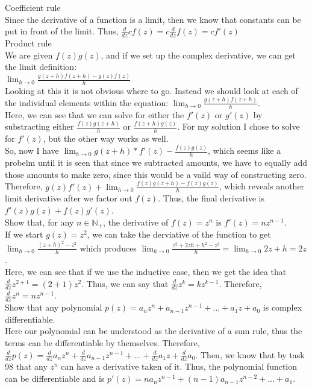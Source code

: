 \documentclass[12pt]{article}
\begin{document}
 Coefficient rule\\
Since the derivative of a function is a limit, then we know that constants can be put in front of the limit.
Thus, $\frac{d}{dz} cf(z) = c \frac{d}{dz} f(z) = cf'(z)$\\

 Product rule\\
We are given $f(z)g(z)$, and if we set up the complex derivative, we can get the limit definition:\\
$\lim_{h\to0} \frac{g(z+h)f(z+h)-g(z)f(z)}{h}$\\
Looking at this it is not obvious where to go. Instead we should look at each of the individual elements within the equation: $\lim_{h\to0} \frac{g(z+h)f(z+h)}{h}$.\\
Here, we can see that we can solve for either the $f'(z)$ or $g'(z)$ by substracting either $\frac{f(z)g(z+h)}{h}$ or $\frac{f(z+h)g(z)}{h}$. 
For my solution I chose to solve for $f'(z)$, but the other way works as well. \\

So, now I have $\lim_{h\to0}g(z+h)*f'(z) - \frac{f(z)g(z)}{h}$, which seems like a probelm until it is seen that since we subtracted amounts, we have to equally add those amounts to make zero, since this would be a vaild way of constructing zero. 
Therefore, $g(z)f'(z) + \lim_{h\to0} \frac{f(z)g(z+h)-f(z)g(z)}{h}$, which reveals another limit derivative after we factor out $f(z)$.
Thus, the final derivative is $f'(z)g(z) + f(z)g'(z)$.\\


 Show that, for any $n \in \mathbb{N}_+$, the derivative of $f(z) = z^n$ is $f'(z) = nz^{n-1}$.\\
If we start $g(z) = z^2$, we can take the derviative of the function to get $\lim_{h\to0}\frac{(z+h)^2 - z^2}{h}$ which produces $\lim_{h\to0}\frac{z^2 + 2zh + h^2 - z^2}{h} = \lim_{h\to0} 2z + h = 2z$.\\
Here, we can see that if we use the inductive case, then we get the idea that $\frac{d}{dz}z^{2+1} = (2+1)z^2$. 
Thus, we can say that $\frac{d}{dz} z^k = kz^{k-1}$.
Therefore, $\frac{d}{dz} z^n = nz^{n-1}$.\\

 Show that any polynomial $p(z) = a_nz^n + a_{n-1}z^{n-1} + ... + a_1z + a_0$ is complex differentiable. \\
Here our polynomial can be understood as the derivative of a sum rule, thus the terms can be differentiable by themselves.
Therefore, $\frac{d}{dz} p(z) = \frac{d}{dz} a_nz^n + \frac{d}{dz} a_{n-1}z^{n-1} + ... + \frac{d}{dz} a_1z + \frac{d}{dz} a_0$.
Then, we know that by task 98 that any $z^n$ can have a derivative taken of it. 
Thus, the polynomial function can be differentiable and is $p'(z) = na_nz^{n-1} + (n-1)a_{n-1}z^{n-2} + ... + a_1$.\\
\end{document}
